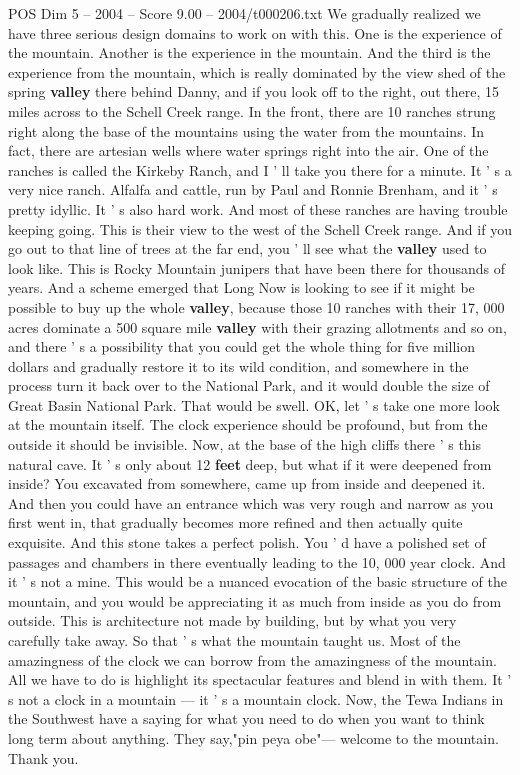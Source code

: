 \begin{textsample}{POS Dim 5 – 2004 – Score 9.00 – 2004/t000206.txt}
We gradually realized we have three serious design domains to work on with this.
One is the experience of the mountain.
Another is the experience in the mountain.
And the third is the experience from the mountain, which is really dominated by the view shed of the spring \textbf{valley} there behind Danny, and if you look off to the right, out there, 15 miles across to the Schell Creek range.
In the front, there are 10 ranches strung right along the base of the mountains using the water from the mountains.
In fact, there are artesian wells where water springs right into the air.
One of the ranches is called the Kirkeby Ranch, and I ' ll take you there for a minute.
It ' s a very nice ranch.
Alfalfa and cattle, run by Paul and Ronnie Brenham, and it ' s pretty idyllic.
It ' s also hard work.
And most of these ranches are having trouble keeping going.
This is their view to the west of the Schell Creek range.
And if you go out to that line of trees at the far end, you ' ll see what the \textbf{valley} used to look like.
This is Rocky Mountain junipers that have been there for thousands of years.
And a scheme emerged that Long Now is looking to see if it might be possible to buy up the whole \textbf{valley}, because those 10 ranches with their 17, 000 acres dominate a 500 square mile \textbf{valley} with their grazing allotments and so on, and there ' s a possibility that you could get the whole thing for five million dollars and gradually restore it to its wild condition, and somewhere in the process turn it back over to the National Park, and it would double the size of Great Basin National Park.
That would be swell.
OK, let ' s take one more look at the mountain itself.
The clock experience should be profound, but from the outside it should be invisible.
Now, at the base of the high cliffs there ' s this natural cave.
It ' s only about 12 \textbf{feet} deep, but what if it were deepened from inside?
You excavated from somewhere, came up from inside and deepened it.
And then you could have an entrance which was very rough and narrow as you first went in, that gradually becomes more refined and then actually quite exquisite.
And this stone takes a perfect polish.
You ' d have a polished set of passages and chambers in there eventually leading to the 10, 000 year clock.
And it ' s not a mine.
This would be a nuanced evocation of the basic structure of the mountain, and you would be appreciating it as much from inside as you do from outside.
This is architecture not made by building, but by what you very carefully take away.
So that ' s what the mountain taught us.
Most of the amazingness of the clock we can borrow from the amazingness of the mountain.
All we have to do is highlight its spectacular features and blend in with them.
It ' s not a clock in a mountain — it ' s a mountain clock.
Now, the Tewa Indians in the Southwest have a saying for what you need to do when you want to think long term about anything.
They say,"pin peya obe"— welcome to the mountain.
Thank you.

\end{textsample}
